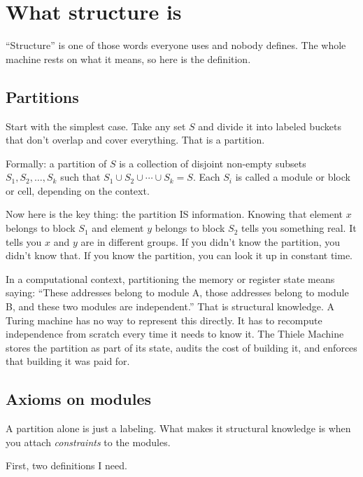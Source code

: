 \documentclass[11pt,a4paper]{article}
\theoremstyle{plain}
\theoremstyle{definition}
\theoremstyle{remark}
\begin{document}
\section{What structure is}
\label{sec:structure}

``Structure'' is one of those words everyone uses and nobody defines. The whole machine rests on what it means, so here is the definition.

\subsection{Partitions}

Start with the simplest case. Take any set $S$ and divide it into labeled buckets that don't overlap and cover everything. That is a partition.

Formally: a partition of $S$ is a collection of disjoint non-empty subsets $S_1, S_2, \ldots, S_k$ such that $S_1 \cup S_2 \cup \cdots \cup S_k = S$. Each $S_i$ is called a module or block or cell, depending on the context.

Now here is the key thing: the partition IS information. Knowing that element $x$ belongs to block $S_1$ and element $y$ belongs to block $S_2$ tells you something real. It tells you $x$ and $y$ are in different groups. If you didn't know the partition, you didn't know that. If you know the partition, you can look it up in constant time.

In a computational context, partitioning the memory or register state means saying: ``These addresses belong to module A, those addresses belong to module B, and these two modules are independent.'' That is structural knowledge. A Turing machine has no way to represent this directly. It has to recompute independence from scratch every time it needs to know it. The Thiele Machine stores the partition as part of its state, audits the cost of building it, and enforces that building it was paid for.

\subsection{Axioms on modules}

A partition alone is just a labeling. What makes it structural knowledge is when you attach \emph{constraints} to the modules.

First, two definitions I need.
\end{document}
